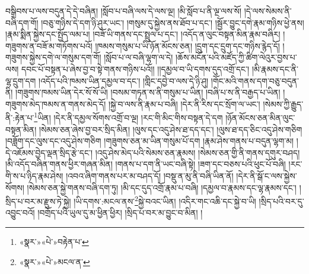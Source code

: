 བསྒྲིབས་པ་ལས་བདུན་དེ་དེ་བཞིན། །སློབ་པ་བཞི་ལས་དེ་ལས་ལྔ། །མི་སློབ་པ་ནི་ལྔ་ལས་སོ། །དེ་ལས་སེམས་ནི་བཞི་དག་གོ། །བཅུ་གཉིས་དེ་དག་ཉི་ཤུར་ཡང་། །གསུམ་དུ་སྐྱེས་ནས་ཐོབ་པ་དང་། །སྦྱོར་བྱུང་དགེ་རྣམ་གཉིས་ཕྱེ་ནས། །རྣམ་སྨིན་སྐྱེས་དང་སྤྱོད་ལམ་པ། །བཟོ་ཡི་གནས་དང་སྤྲུལ་པ་དང་། །འདོད་ན་ལུང་བསྟན་མིན་རྣམ་བཞིར། །གཟུགས་ན་བཟོ་མ་གཏོགས་པའོ། །ཁམས་གསུམ་པ་ཡི་ཉོན་མོངས་ཅན། །དྲུག་དང་དྲུག་དང་གཉིས་རྙེད་དོ། །གཟུགས་སྐྱེས་དགེ་ལ་གསུམ་དག་གོ། །སློབ་པ་ལ་བཞི་ལྷག་ལ་དེ། །ཆོས་མངོན་པའི་མཛོད་ཀྱི་ཚིག་ལེའུར་བྱས་པ་ལས། དབང་པོ་བསྟན་པ་ཞེས་བྱ་བ་སྟེ་གནས་གཉིས་པའོ།། །།དམྱལ་བ་ཡི་དགས་དུད་འགྲོ་དང་། །མི་རྣམས་དང་ནི་ལྷ་དྲུག་དག །འདོད་པའི་ཁམས་ཡིན་དམྱལ་བ་དང་། །གླིང་དབྱེ་བ་ལས་དེ་ཉི་ཤུ། །གོང་མའི་གནས་དག་བཅུ་བདུན་ནི། །གཟུགས་ཁམས་ཡིན་དེར་སོ་སོ་ཡི། །བསམ་གཏན་ས་ནི་གསུམ་པ་ཡིན། །བཞི་པ་ས་ནི་བརྒྱད་པ་ཡིན། །གཟུགས་མེད་ཁམས་ན་གནས་མེད་དོ། །སྐྱེ་བ་ལས་ནི་རྣམ་པ་བཞི། །དེར་ནི་རིས་དང་སྲོག་ལ་ཡང་། །སེམས་ཀྱི་རྒྱུད་ནི་:རྟེན་པ་\footnote{«སྣར་»«པེ་»བརྟེན་པ་}ཡིན། །དེར་ནི་དམྱལ་སོགས་འགྲོ་བ་ལྔ། །རང་གི་མིང་གིས་བསྟན་དེ་དག །ཉོན་མོངས་ཅན་མིན་ལུང་བསྟན་མིན། །སེམས་ཅན་ཞེས་བྱ་བར་སྲིད་མིན། །ལུས་དང་འདུ་ཤེས་ཐ་དད་དང་། །ལུས་ཐ་དད་ཅིང་འདུ་ཤེས་གཅིག །བཟློག་དང་ལུས་དང་འདུ་ཤེས་གཅིག །གཟུགས་ཅན་མ་ཡིན་གསུམ་པོ་དག །རྣམ་ཤེས་གནས་པ་བདུན་ལྷག་མ། །དེ་འཇོམས་བྱེད་ལྡན་སྲིད་རྩེ་དང་། །འདུ་ཤེས་མེད་པའི་སེམས་ཅན་རྣམས། །སེམས་ཅན་གྱི་ནི་གནས་དགུར་བཤད། །མི་འདོད་བཞིན་གནས་ཕྱིར་གཞན་མིན། །གནས་པ་དག་ནི་ཡང་བཞི་སྟེ། །ཟག་དང་བཅས་པའི་ཕུང་པོ་བཞི། །རང་གི་ས་པ་ཉིད་རྣམ་ཤེས། །འབའ་ཞིག་གནས་པར་མ་བཤད་དོ། །བསྡུ་ན་མུ་ནི་བཞི་ཡིན་ནོ། །དེར་ནི་སྒོ་ང་ལས་སྐྱེས་སོགས། །སེམས་ཅན་སྐྱེ་གནས་བཞི་དག་ཏུ། །མི་དང་དུད་འགྲོ་རྣམ་པ་བཞི། །དམྱལ་བ་རྣམས་དང་ལྷ་རྣམས་དང་། །སྲིད་པ་བར་མ་རྫུས་ཏེ་སྐྱེ། །ཡི་དགས་:མངལ་ནས་\footnote{«སྣར་»«པེ་»མངལ་ན་}སྐྱེ་བའང་ཡིན། །འདིར་གང་འཆི་དང་སྐྱེ་བ་ཡི། །སྲིད་པའི་བར་དུ་འབྱུང་བའོ། །བགྲོད་པའི་ཡུལ་དུ་མ་ཕྱིན་ཕྱིར། །སྲིད་པ་བར་མ་བྱུང་བ་མིན། །
